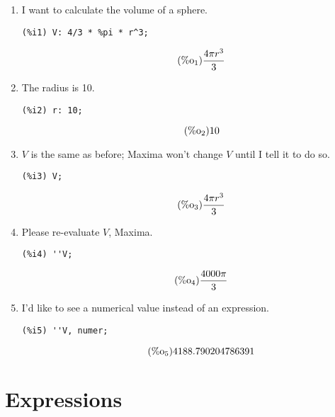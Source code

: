 \documentclass[12pt,leqno]{article}
\begin{document}
\begin{enumerate}

\item I want to calculate the volume of a sphere.
\begin{verbatim}
(%i1) V: 4/3 * %pi * r^3;
\end{verbatim}
\begin{equation}
\tag{$\mathop{\mathrm{\%o}_{1}}$}\frac{4 \pi {r}^{3}}{3}
\label{eq:doc-group1-code1-1}
\end{equation}

\item The radius is 10.
\begin{verbatim}
(%i2) r: 10;
\end{verbatim}
\begin{equation}
\tag{$\mathop{\mathrm{\%o}_{2}}$}10
\label{eq:doc-group1-code2-1}
\end{equation}

\item $V$ is the same as before; Maxima won't change $V$ until I tell it to do so.
\begin{verbatim}
(%i3) V;
\end{verbatim}
\begin{equation}
\tag{$\mathop{\mathrm{\%o}_{3}}$}\frac{4 \pi {r}^{3}}{3}
\label{eq:doc-group1-code3-1}
\end{equation}

\item Please re-evaluate $V$, Maxima.
\begin{verbatim}
(%i4) ''V;
\end{verbatim}
\begin{equation}
\tag{$\mathop{\mathrm{\%o}_{4}}$}\frac{4000 \pi}{3}
\label{eq:doc-group1-code4-1}
\end{equation}

\item I'd like to see a numerical value instead of an expression.
\begin{verbatim}
(%i5) ''V, numer;
\end{verbatim}
\begin{equation}
\tag{$\mathop{\mathrm{\%o}_{5}}$}4188.790204786391
\label{eq:doc-group1-code5-1}
\end{equation}

\end{enumerate}

\section{Expressions}
\end{document}
